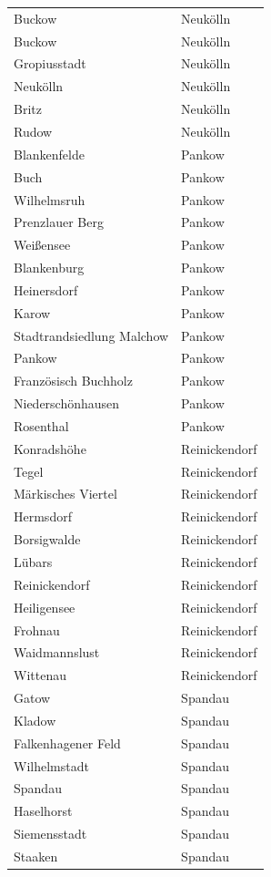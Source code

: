 \begin{table}[H]
\begin{tabular}{ll}
  Buckow & Neukölln \\ 
  Buckow & Neukölln \\ 
  Gropiusstadt & Neukölln \\ 
  Neukölln & Neukölln \\ 
  Britz & Neukölln \\ 
  Rudow & Neukölln \\ 
  Blankenfelde & Pankow \\ 
  Buch & Pankow \\ 
  Wilhelmsruh & Pankow \\ 
  Prenzlauer Berg & Pankow \\ 
  Weißensee & Pankow \\ 
  Blankenburg & Pankow \\ 
  Heinersdorf & Pankow \\ 
  Karow & Pankow \\ 
  Stadtrandsiedlung Malchow & Pankow \\ 
  Pankow & Pankow \\ 
  Französisch Buchholz & Pankow \\ 
  Niederschönhausen & Pankow \\ 
  Rosenthal & Pankow \\ 
  Konradshöhe & Reinickendorf \\ 
  Tegel & Reinickendorf \\ 
  Märkisches Viertel & Reinickendorf \\ 
  Hermsdorf & Reinickendorf \\ 
  Borsigwalde & Reinickendorf \\ 
  Lübars & Reinickendorf \\ 
  Reinickendorf & Reinickendorf \\ 
  Heiligensee & Reinickendorf \\ 
  Frohnau & Reinickendorf \\ 
  Waidmannslust & Reinickendorf \\ 
  Wittenau & Reinickendorf \\ 
  Gatow & Spandau \\ 
  Kladow & Spandau \\ 
  Falkenhagener Feld & Spandau \\ 
  Wilhelmstadt & Spandau \\ 
  Spandau & Spandau \\ 
  Haselhorst & Spandau \\ 
  Siemensstadt & Spandau \\ 
  Staaken & Spandau \\ 

\end{tabular}
\end{table}
